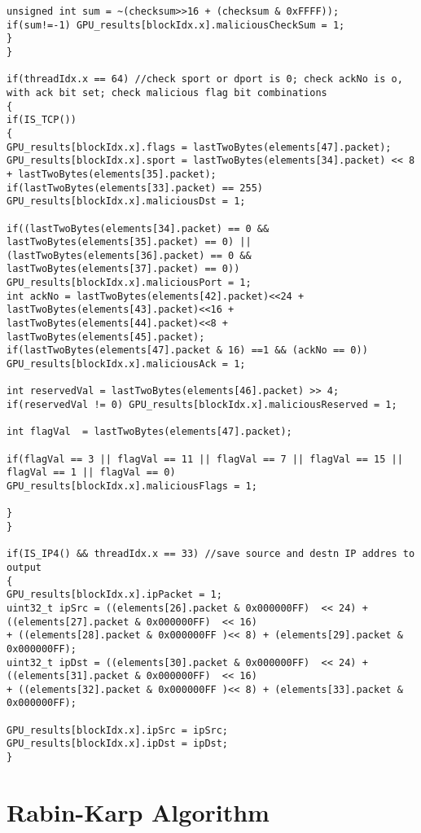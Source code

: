 \begin{lstlisting}
unsigned int sum = ~(checksum>>16 + (checksum & 0xFFFF));
if(sum!=-1) GPU_results[blockIdx.x].maliciousCheckSum = 1;
}
}

if(threadIdx.x == 64) //check sport or dport is 0; check ackNo is o, with ack bit set; check malicious flag bit combinations
{
if(IS_TCP())
{
GPU_results[blockIdx.x].flags = lastTwoBytes(elements[47].packet);
GPU_results[blockIdx.x].sport = lastTwoBytes(elements[34].packet) << 8 + lastTwoBytes(elements[35].packet);
if(lastTwoBytes(elements[33].packet) == 255)
GPU_results[blockIdx.x].maliciousDst = 1;

if((lastTwoBytes(elements[34].packet) == 0 && lastTwoBytes(elements[35].packet) == 0) ||
(lastTwoBytes(elements[36].packet) == 0 && lastTwoBytes(elements[37].packet) == 0))
GPU_results[blockIdx.x].maliciousPort = 1;
int ackNo = lastTwoBytes(elements[42].packet)<<24 + lastTwoBytes(elements[43].packet)<<16 + lastTwoBytes(elements[44].packet)<<8 + lastTwoBytes(elements[45].packet);
if(lastTwoBytes(elements[47].packet & 16) ==1 && (ackNo == 0))
GPU_results[blockIdx.x].maliciousAck = 1;

int reservedVal = lastTwoBytes(elements[46].packet) >> 4;
if(reservedVal != 0) GPU_results[blockIdx.x].maliciousReserved = 1;

int flagVal  = lastTwoBytes(elements[47].packet);

if(flagVal == 3 || flagVal == 11 || flagVal == 7 || flagVal == 15 || flagVal == 1 || flagVal == 0)
GPU_results[blockIdx.x].maliciousFlags = 1;

}
}

if(IS_IP4() && threadIdx.x == 33) //save source and destn IP addres to output
{
GPU_results[blockIdx.x].ipPacket = 1;
uint32_t ipSrc = ((elements[26].packet & 0x000000FF)  << 24) + ((elements[27].packet & 0x000000FF)  << 16)
+ ((elements[28].packet & 0x000000FF )<< 8) + (elements[29].packet & 0x000000FF);
uint32_t ipDst = ((elements[30].packet & 0x000000FF)  << 24) + ((elements[31].packet & 0x000000FF)  << 16)
+ ((elements[32].packet & 0x000000FF )<< 8) + (elements[33].packet & 0x000000FF);

GPU_results[blockIdx.x].ipSrc = ipSrc;
GPU_results[blockIdx.x].ipDst = ipDst;
} 
\end{lstlisting}
\vspace{\topsep}

\section{Rabin-Karp Algorithm}
\vspace{\topsep}
